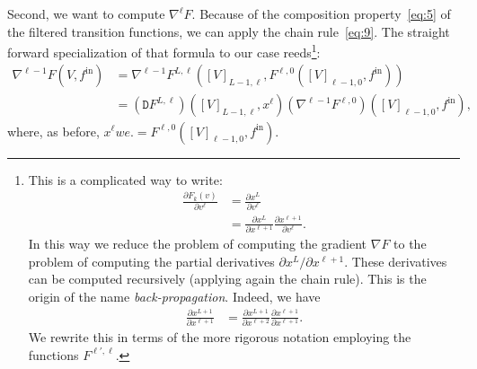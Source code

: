 \documentclass[10pt, a4paper]{article}
\theoremstyle{plain}
\theoremstyle{definition}
\theoremstyle{definition}
\theoremstyle{definition}
\theoremstyle{definition}
\theoremstyle{definition}
\theoremstyle{definition}
\theoremstyle{definition}
\theoremstyle{remark}
\theoremstyle{remark}
\theoremstyle{rudin-style-generic}
\theoremstyle{rudin-style-generic*}
\theoremstyle{rudin-style-theorem}
\newcommand*{\fin}{{f^{\text{in}}}}
\begin{document}
  Second, we want to compute $\nabla^\ell F$.
  Because of the composition property~\eqref{eq:5} of the filtered transition functions, we can apply the chain rule~\eqref{eq:9}. 
  The straight forward specialization of that formula to our case reeds\footnote{This is a complicated way to write:
    \begin{align*}
      \frac{\partial F_k(v)}{\partial v^\ell} 
      &= \frac{\partial x^L}{\partial v^\ell} \\
      &= \frac{\partial x^L}{\partial x^{\ell+1} }\frac{\partial x^{\ell+1}}{\partial v^\ell}
        .
    \end{align*}
    In this way we reduce the problem of computing the gradient $\nabla F$ to the problem of
    computing the partial derivatives $\partial x^L / \partial x^{\ell+1}$.
    These derivatives can be computed recursively (applying again the chain rule). This is the origin of the name \textit{back-propagation}.
    Indeed,  we have
    \begin{equation}\label{eq:11}
      \begin{aligned}
        \frac{\partial x^{L+1}}{\partial x^{\ell+1}}
        &= \frac{\partial x^{L+1}}{\partial x^{\ell+2}}\frac{\partial x^{\ell+1}}{\partial x^{\ell+1}}
          .
      \end{aligned}
    \end{equation}
    We rewrite this in terms of the more rigorous notation employing the functions $F^{\ell',\ell}$.
 }:
  \begin{equation}\label{eq:12}
    \begin{aligned}
      \nabla^{\ell-1} F(V,\fin)
      &= \nabla^{\ell-1} F^{L,\ell}([V]_{L-1,\ell}, F^{\ell,0}([V]_{\ell-1,0} , \fin ) ) \\
      &= (\mathtt D F^{L,\ell})([V]_{L-1,\ell}, x^\ell ) (\nabla^{\ell-1}  F^{\ell,0})([V]_{\ell-1,0} , \fin )
        ,
    \end{aligned}
  \end{equation}
  where, as before, $x^{\ell} we . = F^{\ell,0}([V]_{\ell-1,0}, \fin )$.
\end{document}

